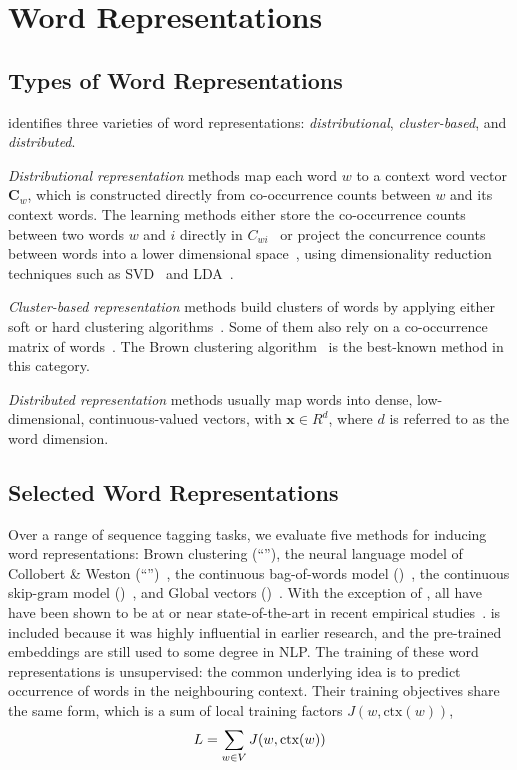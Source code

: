 \section{Word Representations}
\label{wordrep} 

\subsection{Types of Word Representations}
 identifies three varieties of word representations: \textit{distributional},  \textit{cluster-based}, and \textit{distributed}.

\textit{Distributional representation} methods map each word $w$ to a
context word vector $\mathbf{C}_w$, which is constructed directly from
co-occurrence counts between $w$ and its context words.  The learning
methods either store the co-occurrence counts between two words $w$ and
$i$ directly in
$C_{wi}$~\cite{sahlgren2006word,turney2010frequency,honkela1997self} or
project the concurrence counts between words into a lower dimensional
space~\cite{vrehuuvrek2010software,lund1996producing}, using
dimensionality reduction techniques such as SVD~\cite{dumais1988using} and
LDA~\cite{blei2003latent}.

\textit{Cluster-based representation} methods build clusters of words by applying either soft or hard clustering algorithms~\cite{lin2009phrase,li2005semi}. Some of them also rely on a co-occurrence matrix of words~\cite{pereira1993distributional}. The Brown clustering algorithm~\cite{Brown92class-basedn-gram} is the best-known method in this category.

\textit{Distributed representation} methods usually map words into dense,
low-dimensional, continuous-valued vectors, with $\mathbf{x} \in
R^d$, where $d$ is referred to as the word dimension.

\subsection{Selected Word Representations}

Over a range of sequence tagging tasks, we evaluate five methods for
inducing word representations: Brown clustering
\cite{Brown92class-basedn-gram} (``\brown''), the neural language model
of Collobert \& Weston (``\CW'')~\cite{collobert2011natural}, the
continuous bag-of-words model (\CBOW)~\cite{Mikolov13}, the continuous
skip-gram model (\Skipgram)~\cite{Mikolov13NIPS}, and Global vectors
(\Glove)~\cite{pennington2014glove}. With the exception of \CW, all have
have been shown to be at or near state-of-the-art in recent empirical
studies~\cite{turian2010word,pennington2014glove}. \CW is included
because it was highly influential in earlier research, and the pre-trained embeddings are
still used to some degree in NLP. The training of these word
representations is unsupervised: the common underlying idea is to
predict occurrence of words in the neighbouring context. Their training
objectives share the same form, which is a sum of local training factors
$J(w, \text{ctx}(w))$,  
\begin{displaymath}
  L = \sum_{w \in V} J(w, \text{ctx}(w))
\end{displaymath}

